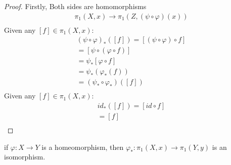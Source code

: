     \begin{proof}
        Firstly, Both sides are homomorphisms
            \begin{align*}
                \pi_1(X,x)\rightarrow\pi_1(Z,(\psi\circ\varphi)(x))\\
            \end{align*}
        Given any $[f]\in\pi_1(X,x)$:
            \begin{align*}
                (\psi\circ\varphi)_{*}([f])=[(\psi\circ\varphi)\circ f]\\
                =[\psi\circ(\varphi\circ f)]\\
                =\psi_{*}[\varphi\circ f]\\
                =\psi_{*}(\varphi_{*}(f))\\
                =(\psi_{*}\circ\varphi_{*})([f])\\
            \end{align*}
        Given any $[f]\in\pi_1(X,x)$:
            \begin{align*}
                id_{*}([f])=[id\circ f]\\
                =[f]\\
            \end{align*}
    \end{proof}
    \begin{theorem} if $\varphi: X\rightarrow Y$ is a homeomorphism,
        then $\varphi_{*}: \pi_{1}(X,x)\rightarrow\pi_{1}(Y,y)$
        is an isomorphism.
    \end{theorem}
